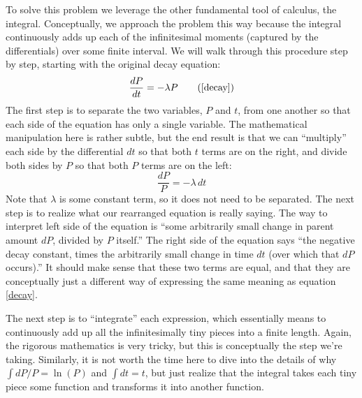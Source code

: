 \documentclass[addpoints, 12pt]{exam}
\begin{document}
To solve this problem we leverage the other fundamental tool of calculus, the integral. Conceptually, we approach the problem this way because the integral continuously adds up each of the infinitesimal moments (captured by the differentials) over some finite interval. We will walk through this procedure step by step, starting with the original decay equation:
\begin{equation}
	\frac{dP}{dt}=-\lambda P\tag{\ref{decay}}
\end{equation}
The first step is to separate the two variables, $P$ and $t$, from one another so that each side of the equation has only a single variable. The mathematical manipulation here is rather subtle, but the end result is that we can ``multiply'' each side by the differential $dt$ so that both $t$ terms are on the right, and divide both sides by $P$ so that both $P$ terms are on the left:
\[\frac{dP}{P}=-\lambda\,dt\]
Note that $\lambda$ is some constant term, so it does not need to be separated. The next step is to realize what our rearranged equation is really saying. The way to interpret left side of the equation is ``some arbitrarily small change in parent amount $dP$, divided by $P$ itself.'' The right side of the equation says ``the negative decay constant, times the arbitrarily small change in time $dt$ (over which that $dP$ occurs).'' It should make sense that these two terms are equal, and that they are conceptually just a different way of expressing the same meaning as equation \ref{decay}. 

The next step is to ``integrate'' each expression, which essentially means to continuously add up all the infinitesimally tiny pieces into a finite length. Again, the rigorous mathematics is very tricky, but this is conceptually the step we're taking. Similarly, it is not worth the time here to dive into the details of why $\int dP/P=\ln(P)$ and $\int dt=t$, but just realize that the integral takes each tiny piece some function and transforms it into another function. 
\end{document}
